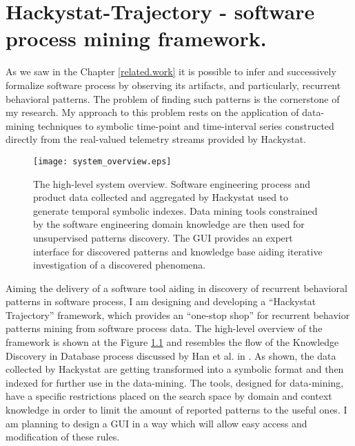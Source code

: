 \chapter{Hackystat-Trajectory - software process mining framework.} \label{trajectory}
As we saw in the Chapter \ref{related.work} it is possible to infer and successively formalize software process by observing its artifacts, and particularly, recurrent behavioral patterns. The problem of finding such patterns is the cornerstone of my research. My approach to this problem rests on the application of data-mining techniques to symbolic time-point and time-interval series constructed directly from the real-valued telemetry streams provided by Hackystat.

\begin{figure}[tbp]
   \centering
   \texttt{[image: system\_overview.eps]}
   \caption{The high-level system overview. Software engineering process and product data collected and aggregated by Hackystat used to generate temporal symbolic indexes. Data mining tools constrained by the software engineering domain knowledge are then used for unsupervised patterns discovery. The GUI provides an expert interface for discovered patterns and knowledge base aiding iterative investigation of a discovered phenomena.}
   \label{fig:system_overview}
\end{figure}


Aiming the delivery of a software tool aiding in discovery of recurrent behavioral patterns in software process, I am designing and developing a ``Hackystat Trajectory'' framework, which provides an ``one-stop shop'' for recurrent behavior patterns mining from software process data. The high-level overview of the framework is shown at the Figure \ref{fig:system_overview} and resembles the flow of the Knowledge Discovery in Database process discussed by Han et al. in \cite{citeulike:709476}. As shown, the data collected by Hackystat are getting transformed into a symbolic format and then indexed for further use in the data-mining. The tools, designed for data-mining, have a specific restrictions placed on the search space by domain and context knowledge in order to limit the amount of reported patterns to the useful ones. I am planning to design a GUI in a way which will allow easy access and modification of these rules. 

